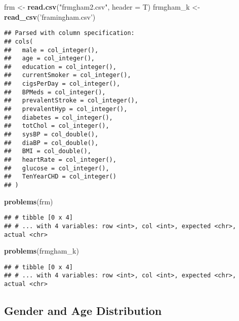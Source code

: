 \documentclass[]{article}
\newenvironment{Shaded}{\begin{snugshade}}{\end{snugshade}}
\newcommand{\KeywordTok}[1]{\textcolor[rgb]{0.13,0.29,0.53}{\textbf{#1}}}
\newcommand{\DataTypeTok}[1]{\textcolor[rgb]{0.13,0.29,0.53}{#1}}
\newcommand{\StringTok}[1]{\textcolor[rgb]{0.31,0.60,0.02}{#1}}
\newcommand{\NormalTok}[1]{#1}
\begin{document}
\begin{Shaded}
\begin{Highlighting}[]
\NormalTok{frm <-}\StringTok{ }\KeywordTok{read.csv}\NormalTok{(}\StringTok{"frmgham2.csv"}\NormalTok{, }\DataTypeTok{header =}\NormalTok{ T)}
\NormalTok{frmgham_k <-}\StringTok{ }\KeywordTok{read_csv}\NormalTok{(}\StringTok{'framingham.csv'}\NormalTok{)}
\end{Highlighting}
\end{Shaded}

\begin{verbatim}
## Parsed with column specification:
## cols(
##   male = col_integer(),
##   age = col_integer(),
##   education = col_integer(),
##   currentSmoker = col_integer(),
##   cigsPerDay = col_integer(),
##   BPMeds = col_integer(),
##   prevalentStroke = col_integer(),
##   prevalentHyp = col_integer(),
##   diabetes = col_integer(),
##   totChol = col_integer(),
##   sysBP = col_double(),
##   diaBP = col_double(),
##   BMI = col_double(),
##   heartRate = col_integer(),
##   glucose = col_integer(),
##   TenYearCHD = col_integer()
## )
\end{verbatim}

\begin{Shaded}
\begin{Highlighting}[]
\KeywordTok{problems}\NormalTok{(frm)}
\end{Highlighting}
\end{Shaded}

\begin{verbatim}
## # tibble [0 x 4]
## # ... with 4 variables: row <int>, col <int>, expected <chr>, actual <chr>
\end{verbatim}

\begin{Shaded}
\begin{Highlighting}[]
\KeywordTok{problems}\NormalTok{(frmgham_k)}
\end{Highlighting}
\end{Shaded}

\begin{verbatim}
## # tibble [0 x 4]
## # ... with 4 variables: row <int>, col <int>, expected <chr>, actual <chr>
\end{verbatim}

\subsection{Gender and Age
Distribution}\label{gender-and-age-distribution}
\end{document}

